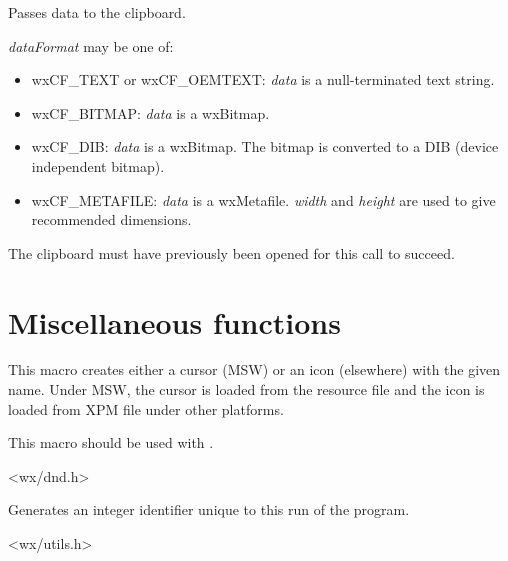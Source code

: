 

Passes data to the clipboard.

{\it dataFormat} may be one of:

\begin{itemize}\itemsep=0pt
\item wxCF\_TEXT or wxCF\_OEMTEXT: {\it data} is a null-terminated text string.
\item wxCF\_BITMAP: {\it data} is a wxBitmap.
\item wxCF\_DIB: {\it data} is a wxBitmap. The bitmap is converted to a DIB (device independent bitmap).
\item wxCF\_METAFILE: {\it data} is a wxMetafile. {\it width} and {\it height} are used to give recommended dimensions.
\end{itemize}

The clipboard must have previously been opened for this call to succeed.

\section{Miscellaneous functions}\label{miscellany}

\label{wxdropicon}


This macro creates either a cursor (MSW) or an icon (elsewhere) with the given
name. Under MSW, the cursor is loaded from the resource file and the icon is
loaded from XPM file under other platforms.

This macro should be used with
.


<wx/dnd.h>



Generates an integer identifier unique to this run of the program.


<wx/utils.h>



